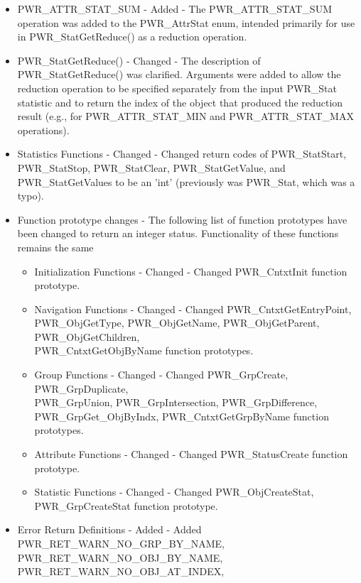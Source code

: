 \documentclass[12pt]{report} %
\begin{document}
\begin{appendices}
\begin{itemize}
    \item{PWR_ATTR_STAT_SUM - Added - The PWR_ATTR_STAT_SUM operation was added to the PWR_AttrStat enum, intended primarily for use in PWR_StatGetReduce() as a reduction operation. }
    \item{PWR_StatGetReduce() - Changed - The description of PWR_StatGetReduce() was clarified. Arguments were added to allow the reduction operation to be specified separately from the input PWR_Stat statistic and to return the index of the object that produced the reduction result (e.g., for PWR_ATTR_STAT_MIN and PWR_ATTR_STAT_MAX operations).}
    \item{Statistics Functions - Changed - Changed return codes of PWR_StatStart, PWR_StatStop, PWR_StatClear, PWR_StatGetValue, and PWR_StatGetValues to be an 'int' (previously was PWR_Stat, which was a typo). }
    \item{Function prototype changes - The following list of function prototypes have been changed to return an integer status. Functionality of these functions remains the same}
    \begin{itemize}
      \item{Initialization Functions - Changed - Changed PWR_CntxtInit function prototype. }
      \item{Navigation Functions - Changed - Changed PWR_CntxtGetEntryPoint,\\
      PWR_ObjGetType, PWR_ObjGetName, PWR_ObjGetParent, PWR_ObjGetChildren,\\ 
      PWR_CntxtGetObjByName function prototypes. }
      \item{Group Functions - Changed - Changed PWR_GrpCreate, PWR_GrpDuplicate,\\
      PWR_GrpUnion, PWR_GrpIntersection, PWR_GrpDifference, \\
      PWR_GrpGet_ObjByIndx, PWR_CntxtGetGrpByName function prototypes. }
      \item{Attribute Functions - Changed - Changed PWR_StatusCreate function prototype. }
      \item{Statistic Functions - Changed - Changed PWR_ObjCreateStat, PWR_GrpCreateStat function prototype. }
    \end{itemize}
    \item{Error Return Definitions - Added - Added PWR_RET_WARN_NO_GRP_BY_NAME,\\
    PWR_RET_WARN_NO_OBJ_BY_NAME, PWR_RET_WARN_NO_OBJ_AT_INDEX, \\
}
\end{itemize}
\end{appendices}
\end{document}
